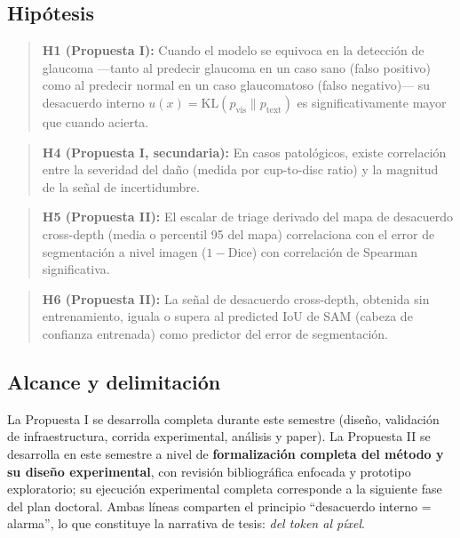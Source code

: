 \documentclass[12pt,a4paper]{article}
\newcommand{\KL}{\mathrm{KL}}
\begin{document}
\subsection{Hipótesis}

\begin{quote}
\textbf{H1 (Propuesta I):} Cuando el modelo se equivoca en la detección de glaucoma ---tanto al predecir glaucoma en un caso sano (falso positivo) como al predecir normal en un caso glaucomatoso (falso negativo)--- su desacuerdo interno $u(x) = \KL(p_{\text{vis}} \| p_{\text{text}})$ es significativamente mayor que cuando acierta.
\end{quote}

\begin{quote}
\textbf{H4 (Propuesta I, secundaria):} En casos patológicos, existe correlación entre la severidad del daño (medida por cup-to-disc ratio) y la magnitud de la señal de incertidumbre.
\end{quote}

\begin{quote}
\textbf{H5 (Propuesta II):} El escalar de triage derivado del mapa de desacuerdo cross-depth (media o percentil 95 del mapa) correlaciona con el error de segmentación a nivel imagen ($1 - \mathrm{Dice}$) con correlación de Spearman significativa.
\end{quote}

\begin{quote}
\textbf{H6 (Propuesta II):} La señal de desacuerdo cross-depth, obtenida sin entrenamiento, iguala o supera al predicted IoU de SAM (cabeza de confianza entrenada) como predictor del error de segmentación.
\end{quote}

\subsection{Alcance y delimitación}

La Propuesta I se desarrolla completa durante este semestre (diseño, validación de infraestructura, corrida experimental, análisis y paper).
La Propuesta II se desarrolla en este semestre a nivel de \textbf{formalización completa del método y su diseño experimental}, con revisión bibliográfica enfocada y prototipo exploratorio; su ejecución experimental completa corresponde a la siguiente fase del plan doctoral.
Ambas líneas comparten el principio ``desacuerdo interno = alarma'', lo que constituye la narrativa de tesis: \textit{del token al píxel}.
\end{document}
